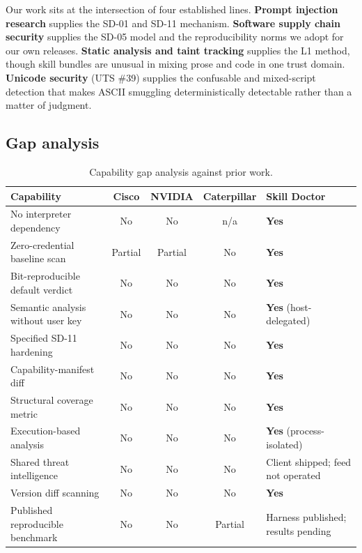 \documentclass[11pt]{article}
\begin{document}
Our work sits at the intersection of four established lines. \textbf{Prompt
injection research} supplies the SD-01 and SD-11 mechanism. \textbf{Software
supply chain security} supplies the SD-05 model and the reproducibility norms
we adopt for our own releases. \textbf{Static analysis and taint tracking}
supplies the L1 method, though skill bundles are unusual in mixing prose and
code in one trust domain. \textbf{Unicode security} (UTS \#39) supplies the
confusable and mixed-script detection that makes ASCII smuggling
deterministically detectable rather than a matter of judgment.

\subsection{Gap analysis}

\begin{table}[htbp]
  \centering
  \caption{Capability gap analysis against prior work.}
  \label{tab:gap}
  \small
  \begin{tabularx}{\textwidth}{Xcccl}
    \toprule
    Capability & Cisco & NVIDIA & Caterpillar & \textbf{Skill Doctor} \\
    \midrule
    No interpreter dependency          & No & No & n/a     & \textbf{Yes} \\
    Zero-credential baseline scan      & Partial & Partial & No & \textbf{Yes} \\
    Bit-reproducible default verdict   & No & No & No      & \textbf{Yes} \\
    Semantic analysis without user key & No & No & No      & \textbf{Yes} (host-delegated) \\
    Specified SD-11 hardening          & No & No & No      & \textbf{Yes} \\
    Capability-manifest diff           & No & No & No      & \textbf{Yes} \\
    Structural coverage metric         & No & No & No      & \textbf{Yes} \\
    Execution-based analysis           & No & No & No      & \textbf{Yes} (process-isolated) \\
    Shared threat intelligence         & No & No & No      & Client shipped; feed not operated \\
    Version diff scanning              & No & No & No      & \textbf{Yes} \\
    Published reproducible benchmark   & No & No & Partial & Harness published; results pending \\
    \bottomrule
  \end{tabularx}
\end{table}
\end{document}
